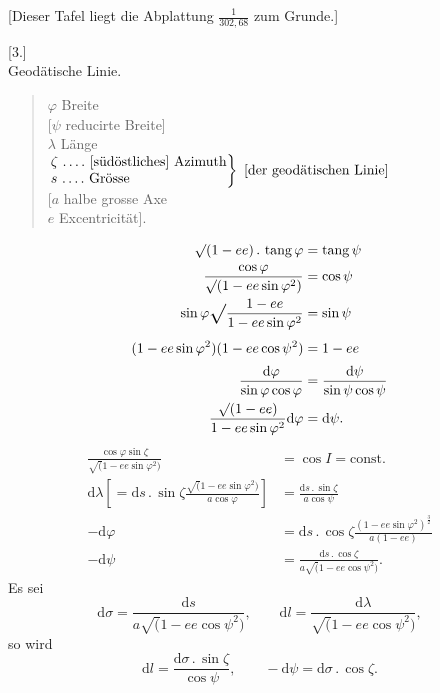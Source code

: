\begin{center}
[Dieser Tafel liegt die Abplattung \(\frac1{302{,}68}\) zum Grunde.]
\end{center}

\par\clearpage
\noindent{}\makebox[12mm][r]{}\par\medskip

\begin{center}
[3.]\\[.5ex]
Geodätische Linie.
\end{center}
\begin{quote}
\noindent \(\varphi\)  Breite\\
{[}\(\psi\)  reducirte Breite]\\
\(\lambda\)  Länge\\
\(\left.
\begin{array}{@{}l@{}}
\zeta\ \text{\ixpoints{4} [südöstliches] Azimuth}\\
s\ \text{\ixpoints{4} Grösse}
\end{array}
\right\}\ \text{[der geodätischen Linie]}\)\\
{[}\(a\)  halbe grosse Axe\\
\(e\)  Excentricität].
\end{quote}
\[
\begin{aligned}
\surd(1-ee)\,.\,\operatorname{tang}\varphi&=\operatorname{tang}\psi\\
\frac{\cos\varphi}{\surd(1-ee\sin\varphi^2)}&=\cos\psi\\
\sin\varphi\ixrad\frac{1-ee}{1-ee\sin\varphi^2}&=\sin\psi\\
(1-ee\sin\varphi^2)(1-ee\cos\psi^2)&=1-ee\\
\frac{\mathrm d\varphi}{\sin\varphi\cos\varphi}
&=\frac{\mathrm d\psi}{\sin\psi\cos\psi}\\
\frac{\surd(1-ee)}{1-ee\sin\varphi^2}\mathrm d\varphi&=\mathrm d\psi.
\end{aligned}
\]
\noindent [Es ist]
\[
\begin{aligned}
\frac{\cos\varphi\sin\zeta}{\surd(1-ee\sin\varphi^2)}&=\cos I=\text{const.}\\
\mathrm d\lambda
\left[=\mathrm ds\,.\,\sin\zeta\frac{\surd(1-ee\sin\varphi^2)}{a\cos\varphi}\right]
&=\frac{\mathrm ds\,.\,\sin\zeta}{a\cos\psi}\\
-\mathrm d\varphi
&=\mathrm ds\,.\,\cos\zeta\frac{(1-ee\sin\varphi^2)^{\frac32}}{a(1-ee)}\\
-\mathrm d\psi&=\frac{\mathrm ds\,.\,\cos\zeta}{a\surd(1-ee\cos\psi^2)}.
\end{aligned}
\]
Es sei
\[
\mathrm d\sigma=\frac{\mathrm ds}{a\surd(1-ee\cos\psi^2)},\qquad
\mathrm dl=\frac{\mathrm d\lambda}{\surd(1-ee\cos\psi^2)},
\]
\noindent so wird
\[
\mathrm dl=\frac{\mathrm d\sigma\,.\,\sin\zeta}{\cos\psi},\qquad
-\mathrm d\psi=\mathrm d\sigma\,.\,\cos\zeta.
\]
\noindent [Da]
\noindent [so ist]
\par

